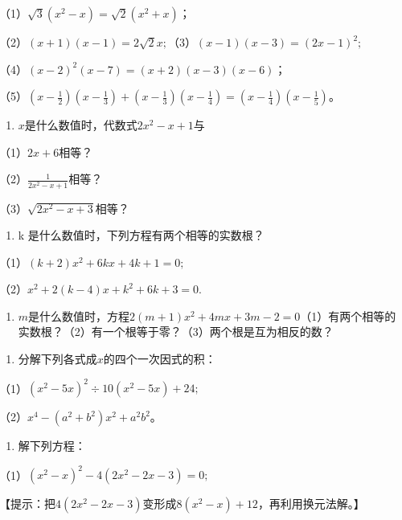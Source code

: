 （1）\(\sqrt{3} (x^2 - x) = \sqrt{2} (x^2 + x)\)；

（2）\((x + 1)(x - 1) = 2\sqrt{2} x;\)（3）\((x - 1)(x - 3) = (2x - 1)^{2};\)

（4）\((x - 2)^{2}(x - 7) = (x + 2)(x - 3)(x - 6)\)；

（5）\(\left(x - \frac{1}{2}\right)\left(x - \frac{1}{3}\right) + \left(x - \frac{1}{3}\right)\left(x - \frac{1}{4}\right) = \left(x - \frac{1}{4}\right)\left(x - \frac{1}{5}\right)\)。

\begin{enumerate}[start=3]
\item
  \(x\)是什么数值时，代数式\(2x^{2} - x + 1\)与
\end{enumerate}

（1）\(2x + 6\)相等？

（2）\(\frac{1}{2x^2 - x + 1}\)相等？

（3）\(\sqrt{2x^2 - x + 3}\)相等？

\begin{enumerate}[start=4]
\item
  k 是什么数值时，下列方程有两个相等的实数根？
\end{enumerate}

（1）\((k + 2)x^{2} + 6kx + 4k + 1 = 0;\)

（2）\(x^{2} + 2(k - 4)x + k^{2} + 6k + 3 = 0.\)

\begin{enumerate}[start=5]
\item
  \(m\)是什么数值时，方程\(2(m + 1)x^{2} + 4mx + 3m - 2 = 0\)（1）有两个相等的实数根？（2）有一个根等于零？（3）两个根是互为相反的数？
\end{enumerate}

\begin{enumerate}[start=6]
\item
  分解下列各式成\(x\)的四个一次因式的积：
\end{enumerate}

（1）\((x^{2}-5x)^{2}\div10(x^{2}-5x)+24;\)

（2）\(x^{4} - (a^{2} + b^{2})x^{2} + a^{2}b^{2}\)。

\begin{enumerate}[start=7]
\item
  解下列方程：
\end{enumerate}

（1）\((x^{2} - x)^{2} - 4(2x^{2} - 2x - 3) = 0;\)

【提示：把\(4(2x^{2} - 2x - 3)\)变形成\(8(x^{2} - x) + 12\)，再利用换元法解。】

